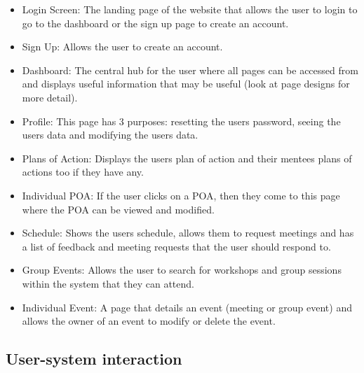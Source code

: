 \documentclass[10pt]{article}
\begin{document}
\begin{itemize}[leftmargin=1.2cm,noitemsep,align=left]
    \item Login Screen: The landing page of the website that allows the user to
    login to go to the dashboard or the sign up page to create an account.
    \item Sign Up: Allows the user to create an account.
    \item Dashboard: The central hub for the user where all pages can be
    accessed from and displays useful information that may be useful (look at
    page designs for more detail).
    \item Profile: This page has 3 purposes: resetting the users password,
    seeing the users data and modifying the users data.
    \item Plans of Action: Displays the users plan of action and their mentees
    plans of actions too if they have any.
    \item Individual POA: If the user clicks on a POA, then they come to this
    page where the POA can be viewed and modified.
    \item Schedule: Shows the users schedule, allows them to request meetings
    and has a list of feedback and meeting requests that the user should respond
    to.
    \item Group Events: Allows the user to search for workshops and group
    sessions within the system that they can attend.
    \item Individual Event: A page that details an event (meeting or group
    event) and allows the owner of an event to modify or delete the event.
\end{itemize}






\subsection{User-system interaction}
\end{document}
